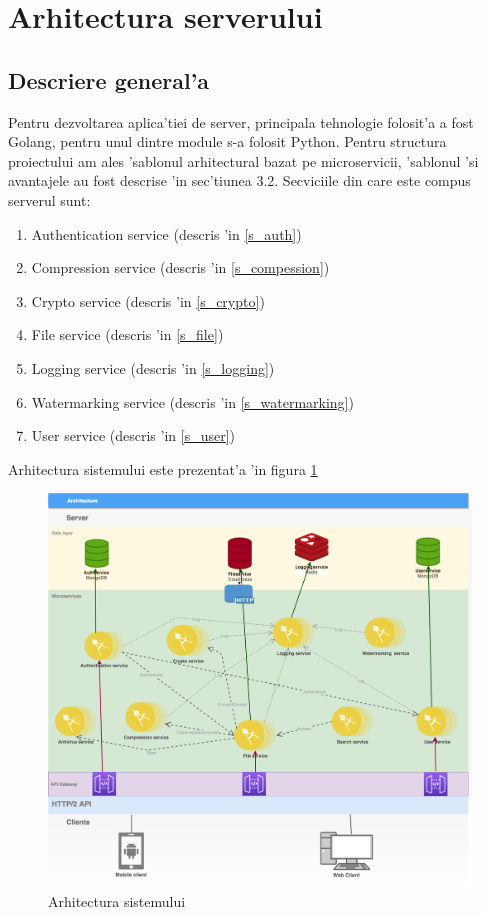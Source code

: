 \documentclass[12pt,a4paper,twoside]{report}
\begin{document}
\section{Arhitectura serverului}
\subsection{Descriere general'a}
Pentru dezvoltarea aplica'tiei de server, principala tehnologie folosit'a a fost Golang, pentru unul dintre module s-a folosit Python.
Pentru structura proiectului am ales 'sablonul arhitectural bazat pe microservicii, 'sablonul 'si avantajele au fost descrise 'in sec'tiunea 3.2.
Secviciile din care este compus serverul sunt:
\begin{enumerate}
\item Authentication service (descris 'in \ref{s_auth})
\item Compression service  (descris 'in \ref{s_compession})
\item Crypto service  (descris 'in \ref{s_crypto})
\item File service  (descris 'in \ref{s_file})
\item Logging service  (descris 'in \ref{s_logging})
\item Watermarking service  (descris 'in \ref{s_watermarking})
\item User service  (descris 'in \ref{s_user})
\end{enumerate}
Arhitectura sistemului este prezentat'a 'in figura \ref{system_architecture}
\begin{figure}[H]
\begin{center}
\advance\leftskip-3cm
\advance\rightskip-3cm
\includegraphics[keepaspectratio=true,scale=0.43]{img/diagrama_sistem.png}
\caption{Arhitectura sistemului}
\label{system_architecture}
\end{center}
\end{figure}
\end{document}
